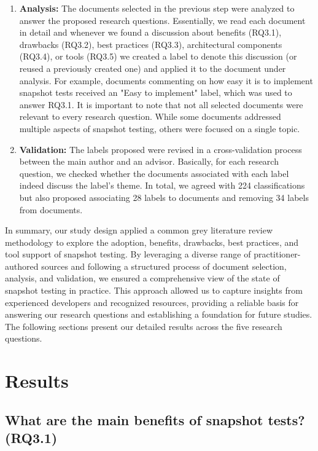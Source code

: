 \documentclass[
	msc, %
	english %
]{../ppgccufmg}
\begin{document}
\begin{enumerate}
            \item \textbf{Analysis:} The documents selected in the previous step were analyzed to answer the proposed research questions. Essentially, we read each document in detail and whenever we found a discussion about benefits (RQ3.1), drawbacks (RQ3.2), best practices (RQ3.3), architectural components (RQ3.4), or tools (RQ3.5) we created a label to denote this discussion (or reused a previously created one) and applied it to the document under analysis. For example, documents commenting on how easy it is to implement snapshot tests received an "Easy to implement" label, which was used to answer RQ3.1. It is important to note that not all selected documents were relevant to every research question. While some documents addressed multiple aspects of snapshot testing, others were focused on a single topic.

            \item \textbf{Validation:} The labels proposed were revised in a cross-validation process between the main author and an advisor. Basically, for each research question, we checked whether the documents associated with each label indeed discuss the label’s theme. In total, we agreed with 224 classifications but also proposed associating 28 labels to documents and removing 34 labels from documents. 
        
        \end{enumerate}

        \noindent In summary, our study design applied a common grey literature review methodology to explore the adoption, benefits, drawbacks, best practices, and tool support of snapshot testing. By leveraging a diverse range of practitioner-authored sources and following a structured process of document selection, analysis, and validation, we ensured a comprehensive view of the state of snapshot testing in practice. This approach allowed us to capture insights from experienced developers and recognized resources, providing a reliable basis for answering our research questions and establishing a foundation for future studies. The following sections present our detailed results across the five research questions.

        \section{Results}\label{sec:ch3-results}

        \subsection{What are the main benefits of snapshot tests? (RQ3.1)}
\end{document}
